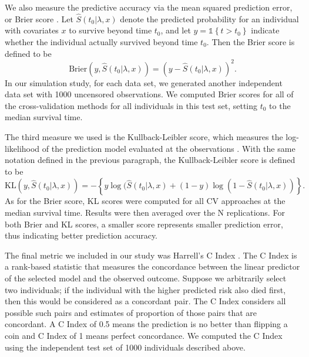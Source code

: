 \par We also measure the predictive accuracy via the mean squared prediction error, or Brier score \citep{VanHouwelingen2011}. Let $\hat{S}(t_0|\lambda,x)$ denote the predicted probability for an individual with covariates $x$ to survive beyond time $t_0$, and let $y = \mathbb{1}\left\{ t > t_{0}\right\}$ indicate whether the individual actually survived beyond time $t_0$. Then the Brier score is defined to be
\begin{equation}
\text{Brier}(y, \hat{S}(t_0|\lambda,x)) = (y - \hat{S}(t_0|\lambda,x))^2.
\end{equation}
In our simulation study, for each data set, we generated another independent data set with 1000 uncensored observations. We computed Brier scores for all of the cross-validation methods for all individuals in this test set, setting $t_0$ to the median survival time.

\par The third measure we used is the Kullback-Leibler score, which measures the log-likelihood of the prediction model evaluated at the observations \citep{VanHouwelingen2011}. With the same notation defined in the previous paragraph, the Kullback-Leibler score is defined to be
\begin{equation}
	\text{KL}(y, \hat{S}(t_0|\lambda,x)) = -\left\{ y\log(\hat{S}(t_0|\lambda,x) + (1 - y)\log(1 - \hat{S}(t_0|\lambda,x)) \right\}.
\end{equation}
As for the Brier score, KL scores were computed for all CV approaches at the median survival time.  Results were then averaged over the N replications. For both Brier and KL scores, a smaller score represents smaller prediction error, thus indicating better prediction accuracy.

\par The final metric we included in our study was Harrell's C Index \citep{HarrellJr1984}. The C Index is a rank-based statistic that measures the concordance between the linear predictor of the selected model and the observed outcome. Suppose we arbitrarily select two individuals; if the individual with the higher predicted risk also died first, then this would be considered as a concordant pair. The C Index considers all possible such pairs and estimates of proportion of those pairs that are concordant. A C Index of 0.5 means the prediction is no better than flipping a coin and C Index of 1 means perfect concordance. We computed the C Index using the independent test set of 1000 individuals described above.

